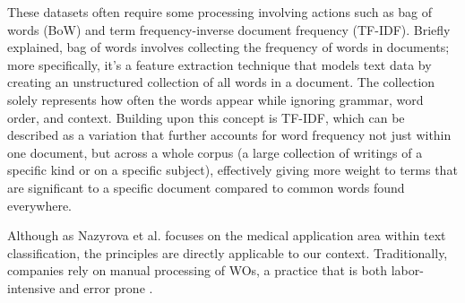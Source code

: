 These datasets often require some processing involving actions such as bag of words (BoW) and term frequency-inverse document frequency (TF-IDF). Briefly explained, \cite{murel2024bagofwords} bag of words involves collecting the frequency of words in documents; more specifically, it's a feature extraction technique that models text data by creating an unstructured collection of all words in a document. The collection solely represents how often the words appear while ignoring grammar, word order, and context. Building upon this concept is TF-IDF, which can be described as a variation that further accounts for word frequency not just within one document, but across a whole corpus (a large collection of writings of a specific kind or on a specific subject), effectively giving more weight to terms that are significant to a specific document compared to common words found everywhere.

Although as Nazyrova et al. \cite{nazyrova2024medical} focuses on the medical application area within text classification, the principles are directly applicable to our context.  Traditionally, companies rely on manual processing of WOs, a practice that is both labor-intensive and error prone \cite{li2024work}.